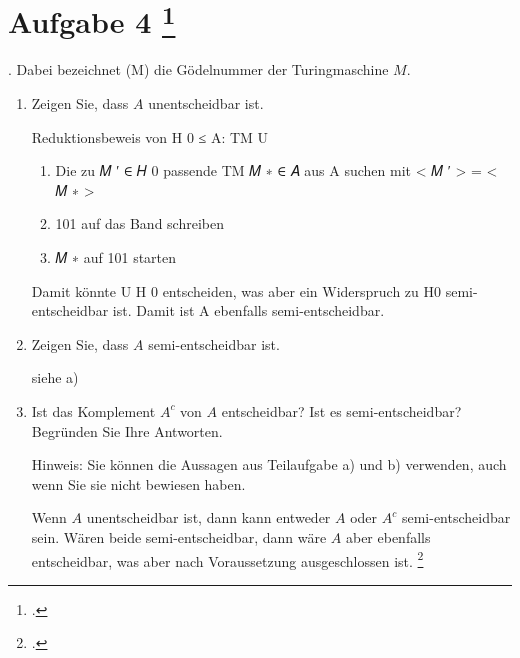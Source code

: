 \documentclass{lehramt-informatik-aufgabe}
\begin{document}
\section{Aufgabe 4
\footcite{66115:2020:03}}


.
Dabei bezeichnet (M) die Gödelnummer der Turingmaschine $M$.
\begin{enumerate}


\item Zeigen Sie, dass $A$ unentscheidbar ist.

\begin{liAntwort}
Reduktionsbeweis von H 0 ≤ A:
TM U
\begin{enumerate}

\item Die zu 𝑀 ′ ∈ 𝐻 0 passende TM 𝑀 ∗ ∈ 𝐴 aus A suchen mit < 𝑀 ′ > = < 𝑀 ∗ >
\item 101 auf das Band schreiben
\item 𝑀 ∗ auf 101 starten
\end{enumerate}
Damit könnte U H 0 entscheiden, was aber ein Widerspruch zu H0 semi-
entscheidbar ist. Damit ist A ebenfalls semi-entscheidbar.
\end{liAntwort}


\item Zeigen Sie, dass $A$ semi-entscheidbar ist.

\begin{liAntwort}
siehe a)
\end{liAntwort}


\item Ist das Komplement $A^c$ von $A$ entscheidbar? Ist es semi-entscheidbar? Begründen
Sie Ihre Antworten.

Hinweis: Sie können die Aussagen aus Teilaufgabe a) und b) verwenden, auch wenn Sie sie
nicht bewiesen haben.

\begin{liAntwort}
Wenn $A$ unentscheidbar ist, dann kann entweder $A$ oder $A^c$
semi-entscheidbar sein. Wären beide semi-entscheidbar, dann wäre $A$
aber ebenfalls entscheidbar, was aber nach Voraussetzung ausgeschlossen
ist.
\footcite[Seite 52]{theo:fs:4}
\end{liAntwort}

\end{enumerate}
\end{document}
